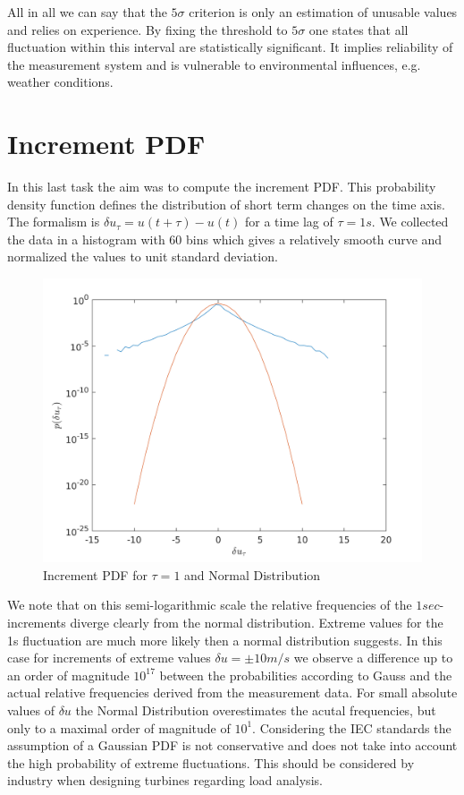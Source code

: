 \documentclass[10pt]{article}
\begin{document}
All in all we can say that the $5\sigma$ criterion is only an estimation of unusable values and relies on experience. By fixing the threshold to $5\sigma$ one states that all fluctuation within this interval are statistically significant. It implies reliability of the measurement system and is vulnerable to environmental influences, e.g. weather conditions.

\section{Increment PDF}
In this last task the aim was to compute the increment PDF. This probability density function defines the distribution of short term changes on the time axis. The formalism is $\delta u_{\tau} = u(t+\tau)-u(t)$ for a time lag of $\tau=1s$. We collected the data in a histogram with $60$ bins which gives a relatively smooth curve and normalized the values to unit standard deviation.
\begin{figure}[htb!]
  \centering
  \includegraphics[width=1\linewidth]{../Plots/tau_pdf_gauss10.png}
  \caption{Increment PDF for $\tau=1$ and Normal Distribution}
  \label{fig:incrementPdf}
\end{figure}
We note that on this semi-logarithmic scale the relative frequencies of the $1sec$-increments diverge clearly from the normal distribution. Extreme values for the 1s fluctuation are much more likely then a normal distribution suggests. In this case for increments of extreme values $\delta u=\pm10 m/s$ we observe a difference up to an order of magnitude $10^{17}$ between the probabilities according to Gauss and the actual relative frequencies derived from the measurement data. For small absolute values of $\delta u$ the Normal Distribution overestimates the acutal frequencies, but only to a maximal order of magnitude of $10^1$. Considering the IEC standards the assumption of a Gaussian PDF is not conservative and does not take into account the high probability of extreme fluctuations. This should be considered by industry when designing turbines regarding load analysis.
\newpage
\appendix
\end{document}
